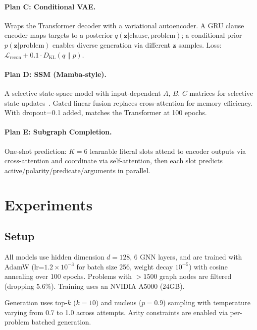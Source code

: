 \documentclass{article}
\begin{document}
\paragraph{Plan C: Conditional VAE.}
Wraps the Transformer decoder with a variational autoencoder. A GRU clause encoder
maps targets to a posterior $q(\mathbf{z}|\text{clause}, \text{problem})$; a
conditional prior $p(\mathbf{z}|\text{problem})$ enables diverse generation
via different $\mathbf{z}$ samples. Loss: $\mathcal{L}_\text{recon} + 0.1 \cdot D_\text{KL}(q \| p)$.

\paragraph{Plan D: SSM (Mamba-style).}
A selective state-space model with input-dependent $A$, $B$, $C$ matrices for
selective state updates~\cite{gu2023mamba}. Gated linear fusion replaces
cross-attention for memory efficiency. With dropout=0.1 added, matches the
Transformer at 100 epochs.

\paragraph{Plan E: Subgraph Completion.}
One-shot prediction: $K{=}6$ learnable literal slots attend to encoder outputs
via cross-attention and coordinate via self-attention, then each slot predicts
active/polarity/predicate/arguments in parallel.

\section{Experiments}
\label{sec:experiments}

\subsection{Setup}

All models use hidden dimension $d{=}128$, 6 GNN layers, and are trained with
AdamW (lr=$1.2{\times}10^{-3}$ for batch size 256, weight decay $10^{-5}$) with
cosine annealing over 100 epochs. Problems with $>1500$ graph nodes are filtered
(dropping 5.6\%). Training uses an NVIDIA A5000 (24GB).

Generation uses top-$k$ ($k{=}10$) and nucleus ($p{=}0.9$) sampling with temperature
varying from 0.7 to 1.0 across attempts. Arity constraints are enabled via
per-problem batched generation.
\end{document}
